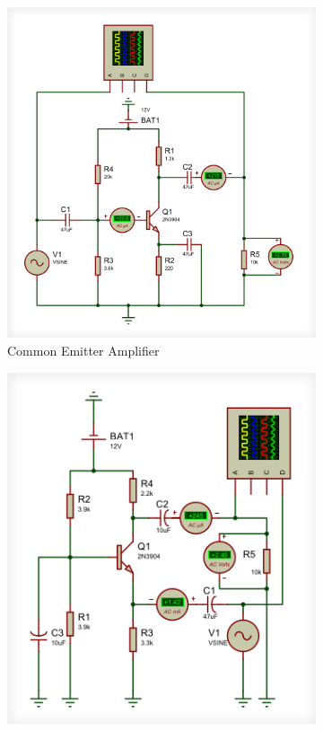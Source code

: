 \documentclass[12pt]{article}
\begin{document}
\begin{figure}[h!]
    \centering
    \begin{subfigure}{0.45\textwidth}
        \centering
        \includegraphics[width=0.9\linewidth]{CE.png}
        \caption{Common Emitter Amplifier}
    \end{subfigure}
    \begin{subfigure}{0.45\textwidth}
        \centering
        \includegraphics[width=0.9\linewidth]{CB.png}

\end{subfigure}
\end{figure}
\end{document}

